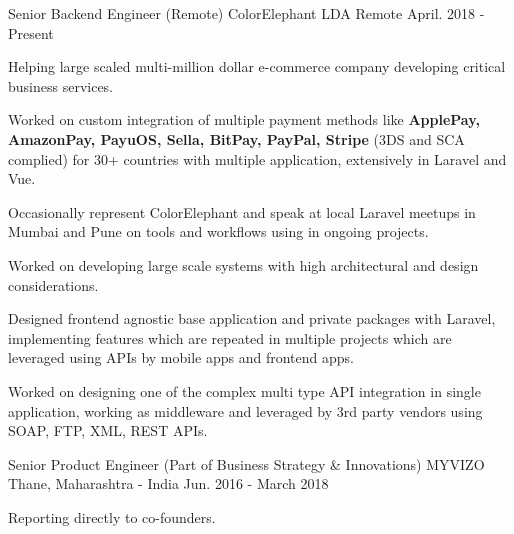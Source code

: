 

\begin{cventries}
  \cventry
    {Senior Backend Engineer (Remote)} %
    {ColorElephant LDA} %
    {Remote} %
    {April. 2018 - Present} %
    {
      \begin{cvitems} %
        \item{Helping large scaled multi-million dollar e-commerce company developing critical business services.}
        \item {Worked on custom integration of multiple payment methods like \textbf{ApplePay, AmazonPay, PayuOS, Sella, BitPay, PayPal, Stripe} (3DS and SCA complied) for 30+ countries with multiple application, extensively in Laravel and Vue.}
        \item {Occasionally represent ColorElephant and speak at local Laravel meetups in Mumbai and Pune on tools and workflows using in ongoing projects.}
        \item {Worked on developing large scale systems with high architectural and design considerations.}
        \item {Designed frontend agnostic base application and private packages with Laravel, implementing features which are repeated in multiple projects which are leveraged using APIs by mobile apps and frontend apps.}
        \item {Worked on designing one of the complex multi type API integration in single application, working as middleware and leveraged by 3rd party vendors using SOAP, FTP, XML, REST APIs.}
      \end{cvitems}
    }
  \cventry
    {Senior Product Engineer (Part of Business Strategy \& Innovations)} %
    {MYVIZO} %
    {Thane, Maharashtra - India} %
    {Jun. 2016 - March 2018} %
    {
      \begin{cvitems} %
      	\item {Reporting directly to co-founders.}

\end{cvitems}}
\end{cventries}
